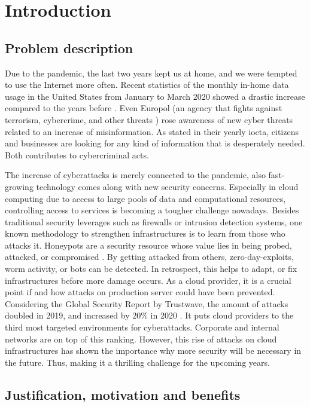 \chapter{Introduction}

\section{Problem description}

Due to the pandemic, the last two years kept us at home, and we were tempted to use the Internet more often.
Recent statistics of the monthly in-home data usage in the United States from January to March 2020 showed a drastic increase compared to the years before \cite{statista2021}.
Even Europol (an agency that fights against terrorism, cybercrime, and other threats \cite{europol2021}) rose awareness of new cyber threats related to an increase of misinformation.
As stated in their yearly \ac{iocta}, citizens and businesses are looking for any kind of information that is desperately needed.
Both contributes to cybercriminal acts. \cite{iocta2020}

The increase of cyberattacks is merely connected to the pandemic, also fast-growing technology comes along with new security concerns.
Especially in cloud computing due to access to large pools of data and computational resources, controlling access to services is becoming a tougher challenge nowadays.
Besides traditional security leverages such as firewalls or intrusion detection systems, one known methodology to strengthen infrastructures is to learn from those who attacks it.
Honeypots are a security resource whose value lies in being probed, attacked, or compromised \cite{Spitzner2003}.
By getting attacked from others, zero-day-exploits, worm activity, or bots can be detected.
In retrospect, this helps to adapt, or fix infrastructures before more damage occurs.
As a cloud provider, it is a crucial point if and how attacks on production server could have been prevented.
Considering the Global Security Report by Trustwave, the amount of attacks doubled in 2019, and increased by $20\%$ in 2020 \cite{fahim2020}.
It puts cloud providers to the third most targeted environments for cyberattacks.
Corporate and internal networks are on top of this ranking.
However, this rise of attacks on cloud infrastructures has shown the importance why more security will be necessary in the future.
Thus, making it a thrilling challenge for the upcoming years.

\section{Justification, motivation and benefits}

